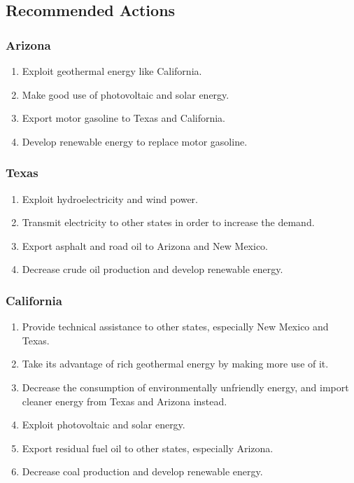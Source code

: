 \documentclass{mcmthesis}
\begin{document}
\subsection{Recommended Actions}
\subsubsection{Arizona}
\begin{enumerate}
\item Exploit geothermal energy like California.
\item Make good use of photovoltaic and solar energy.
\item Export motor gasoline to Texas and California.
\item Develop renewable energy to replace motor gasoline.
\end{enumerate}

\subsubsection{Texas}
\begin{enumerate}
\item Exploit hydroelectricity and wind power.
\item Transmit electricity to other states in order to increase the demand.
\item Export asphalt and road oil to Arizona and New Mexico.
\item Decrease crude oil production and develop renewable energy.
\end{enumerate}

\subsubsection{California}
\begin{enumerate}
\item Provide technical assistance to other states, especially New Mexico and Texas.
\item Take its advantage of rich geothermal energy by making more use of it.
\item Decrease the consumption of environmentally unfriendly energy, and import cleaner energy from Texas and Arizona instead.
\item Exploit photovoltaic and solar energy.
\item Export residual fuel oil to other states, especially Arizona.
\item Decrease coal production and develop renewable energy.
\end{enumerate}
\end{document}
